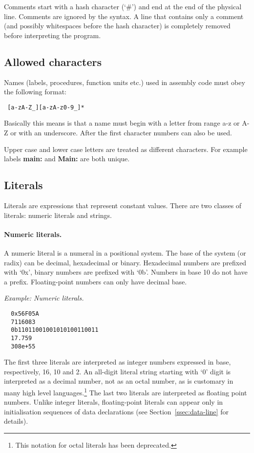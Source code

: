 \documentclass[twoside]{tceusermanual}
\begin{document}
Comments start with a hash character (`\#') and end at the end of the
physical line.  Comments are ignored by the syntax.  A line that contains
only a comment (and possibly whitespaces before the hash character) is
completely removed before interpreting the program.

\subsection{Allowed characters}
\label{sec:names}

Names (labels, procedures, function units etc.) used in assembly code must
obey the following format:

\begin{verbatim}
 [a-zA-Z_][a-zA-z0-9_]*
\end{verbatim}

Basically this means is that a name must begin with a letter from range
a-z or A-Z or with an underscore. After the first character numbers can also
be used.

Upper case and lower case letters are treated as different characters.
For example labels \textbf{main:} and \textbf{Main:} are both unique.

\subsection{Literals}
\label{ssec:literals}

Literals are expressions that represent constant values. There are two
classes of literals: numeric literals and strings.

\paragraph{Numeric literals.}

A numeric literal is a numeral in a positional system. The base of the
system (or radix) can be decimal, hexadecimal or binary. Hexadecimal numbers
are prefixed with `0x', binary numbers are prefixed with `0b'. Numbers in
base 10 do not have a prefix. Floating-point numbers can only have decimal
base.

\emph{Example: Numeric literals.}
%
\begin{verbatim}
  0x56F05A
  7116083
  0b11011001001010100110011
  17.759
  308e+55
\end{verbatim}
The first three literals are interpreted as integer numbers expressed in
base, respectively, 16, 10 and 2. An all-digit literal string starting with
`0' digit is interpreted as a decimal number, not as an octal number, as is
customary in many high level languages.\footnote{
%
  This notation for octal literals has been deprecated.}
%
The last two literals are interpreted as floating point numbers. Unlike
integer literals, floating-point literals can appear only in initialisation
sequences of data declarations (see Section~\ref{ssec:data-line} for
details).
\end{document}
